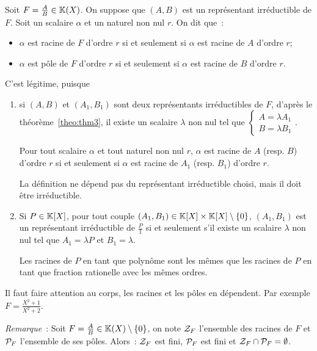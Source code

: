 \begin{defdef}
  Soit \(F=\frac{A}{B} \in \K(X)\). On suppose que \((A,B)\) est un représentant irréductible de \(F\). Soit un scalaire \(\alpha\) et un naturel non nul \(r\). On dit que~:
  \begin{itemize}
  \item \(\alpha\) est racine de \(F\) d'ordre \(r\) si et seulement si \(\alpha\) est racine de \(A\) d'ordre \(r\);
  \item \(\alpha\) est pôle de \(F\) d'ordre \(r\) si et seulement si \(\alpha\) est racine de \(B\) d'ordre \(r\).
  \end{itemize}
\end{defdef}

C'est légitime, puisque
\begin{enumerate}
\item si \((A,B)\) et \((A_1,B_1)\) sont deux représentants irréductibles de \(F\), d'après le théorème~\ref{theo:thm3}, il existe un scalaire \(\lambda\) non nul tel que \(\begin{cases} A=\lambda A_1 \\ B = \lambda B_1 \end{cases}\).

  Pour tout scalaire \(\alpha\) et tout naturel non nul \(r\), \(\alpha\) est racine de \(A\) (resp. \(B\)) d'ordre \(r\) si et seulement si \(\alpha\) est racine de \(A_1\) (resp. \(B_1\)) d'ordre \(r\).

  La définition ne dépend pas du représentant irréductible choisi, mais il doit être irréductible.
\item Si \(P \in \K[X]\), pour tout couple \((A_1,B_1) \in \K[X] \times \K[X]\setminus\{0\}\), \((A_1,B_1)\) est un représentant irréductible de \(\frac{P}{1}\) si et seulement s'il existe un scalaire \(\lambda\) non nul tel que \(A_1=\lambda P\) et \(B_1=\lambda\).

  Les racines de \(P\) en tant que polynôme sont les mêmes que les racines de \(P\) en tant que fraction rationelle avec les mêmes ordres.
\end{enumerate}

Il faut faire attention au corps, les racines et les pôles en dépendent. Par exemple \(F=\frac{X^2+1}{X^2+2}\).

\emph{Remarque}~: Soit \(F=\frac{A}{B} \in \K(X)\setminus\{0\}\), on note \(\ZZ_F\) l'ensemble des racines de \(F\) et \(\P_F\) l'ensemble de ses pôles. Alors~: \(\ZZ_F\) est fini, \(\P_F\) est fini et \(\ZZ_F \cap \P_F =\emptyset\).

